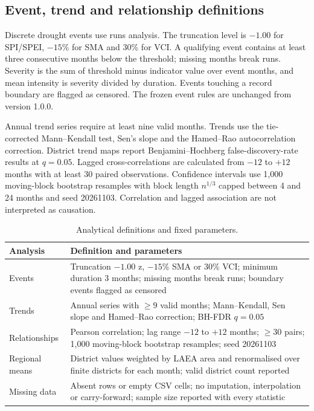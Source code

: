 \documentclass[10pt,a4paper]{article}
\begin{document}
\subsection*{Event, trend and relationship definitions}
Discrete drought events use runs analysis\citep{Yevjevich1967}. The truncation level is $-1.00$ for SPI/SPEI, $-15$\% for SMA and 30\% for VCI. A qualifying event contains at least three consecutive months below the threshold; missing months break runs. Severity is the sum of threshold minus indicator value over event months, and mean intensity is severity divided by duration. Events touching a record boundary are flagged as censored. The frozen event rules are unchanged from version 1.0.0.

Annual trend series require at least nine valid months. Trends use the tie-corrected Mann--Kendall test\citep{Mann1945}, Sen's slope\citep{Sen1968} and the Hamed--Rao autocorrelation correction\citep{HamedRao1998}. District trend maps report Benjamini--Hochberg false-discovery-rate results at $q=0.05$\citep{BenjaminiHochberg1995}. Lagged cross-correlations are calculated from $-12$ to $+12$ months with at least 30 paired observations. Confidence intervals use 1,000 moving-block bootstrap resamples with block length $n^{1/3}$ capped between 4 and 24 months and seed 20261103\citep{Kunsch1989}. Correlation and lagged association are not interpreted as causation.

\begin{table}[t]
\caption{Analytical definitions and fixed parameters.}
\label{tab:params}
\small
\begin{tabularx}{\textwidth}{@{}>{\RaggedRight\arraybackslash}p{}>{\RaggedRight\arraybackslash}X@{}}
\toprule
Analysis & Definition and parameters \\
\midrule
Events & Truncation $-1.00$ z, $-15$\% SMA or 30\% VCI; minimum duration 3 months; missing months break runs; boundary events flagged as censored \\
Trends & Annual series with $\ge9$ valid months; Mann--Kendall, Sen slope and Hamed--Rao correction; BH-FDR $q=0.05$ \\
Relationships & Pearson correlation; lag range $-12$ to $+12$ months; $\ge30$ pairs; 1,000 moving-block bootstrap resamples; seed 20261103 \\
Regional means & District values weighted by LAEA area and renormalised over finite districts for each month; valid district count reported \\
Missing data & Absent rows or empty CSV cells; no imputation, interpolation or carry-forward; sample size reported with every statistic \\
\bottomrule
\end{tabularx}
\end{table}
\end{document}
